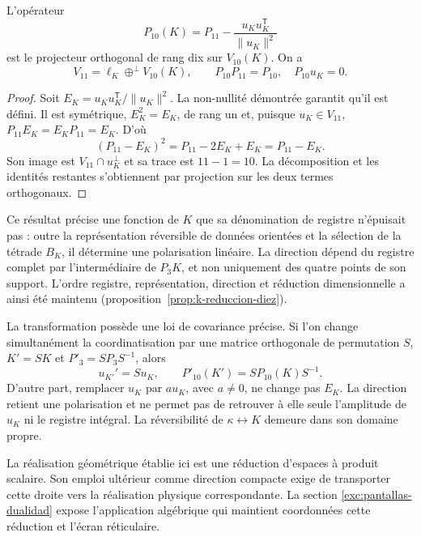 \begin{proposition}
\label{prop:k-reduccion-diez}
L'opérateur
\begin{equation}
 P_{10}(K)=P_{11}
       -\frac{u_Ku_K^{\mathsf T}}{\lVert u_K\rVert^2}
 \label{eq:k-proyector-diez}
\end{equation}
est le projecteur orthogonal de rang dix sur \(V_{10}(K)\). On a
\[
 V_{11}=\ell_K\mathbin{\oplus^{\perp}}V_{10}(K),
 \qquad P_{10}P_{11}=P_{10},\quad P_{10}u_K=0.
\]
\end{proposition}
\begin{proof}
Soit \(E_K=u_Ku_K^{\mathsf T}/\lVert u_K\rVert^2\). La non-nullité démontrée garantit qu'il est défini. Il est symétrique, \(E_K^2=E_K\), de rang un et, puisque \(u_K\in V_{11}\), \(P_{11}E_K=E_KP_{11}=E_K\). D'où
\[
 (P_{11}-E_K)^2=P_{11}-2E_K+E_K=P_{11}-E_K.
\]
Son image est \(V_{11}\cap u_K^\perp\) et sa trace est
\(11-1=10\). La décomposition et les identités restantes
s'obtiennent par projection sur les deux termes orthogonaux.
\end{proof}

Ce résultat précise une fonction de \(K\) que sa dénomination de registre n'épuisait pas : outre la représentation réversible de données orientées et la sélection de la tétrade \(B_K\), il détermine une polarisation linéaire. La direction dépend du registre complet par l'intermédiaire de \(P_3K\), et non uniquement des quatre points de son support. L'ordre registre, représentation, direction et réduction dimensionnelle a ainsi été maintenu (proposition~\ref{prop:k-reduccion-diez}).

La transformation possède une loi de covariance précise. Si l'on change
simultanément la coordinatisation par une matrice orthogonale de permutation \(S\),
\(K'=SK\) et \(P'_3=SP_3S^{-1}\), alors
\[
 u_{K'}'=Su_K,\qquad P'_{10}(K')=SP_{10}(K)S^{-1}.
\]
D'autre part, remplacer \(u_K\) par \(a u_K\), avec \(a\ne0\),
ne change pas \(E_K\). La direction retient une polarisation et ne
permet pas de retrouver à elle seule l'amplitude de \(u_K\) ni le
registre intégral. La réversibilité de \(\kappa\leftrightarrow K\)
demeure dans son domaine propre.

La réalisation géométrique établie ici est une réduction d'espaces à produit scalaire. Son emploi ultérieur comme direction compacte exige de transporter cette droite vers la réalisation physique correspondante. La section \ref{exc:pantallas-dualidad} expose l'application algébrique qui maintient coordonnées cette réduction et l'écran réticulaire.
